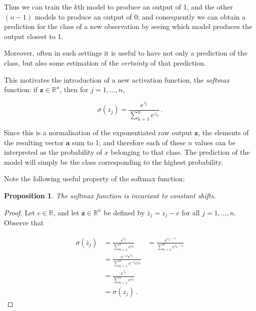 \documentclass{article}[11pt]
\newtheorem{proposition}{Proposition}
\begin{document}
        Thus we can train the $k$th model to produce an output of 1, and the other $(n-1)$ models to produce an output of 0; and consequently we can obtain a prediction for the class of a new observation by seeing which model produces the output closest to 1.

        Moreover, often in such settings it is useful to have not only a prediction of the class, but also some estimation of the \textit{certainty} of that prediction.
        
        This motivates the introduction of a new activation function, the \textit{softmax} function: if $\mathbf{z} \in \mathbb{R}^n$, then for $j = 1, \ldots, n$,
        
        $$
        \sigma(z_j) = \frac{e^{z_j}}{\sum_{k=1}^{n} e^{z_k}} \,.
        $$
        
        Since this is a normalisation of the exponentiated raw output $\mathbf{z}$, the elements of the resulting vector $\mathbf{a}$ sum to 1; and therefore each of these $n$ values can be interpreted as the probability of $x$ belonging to that class. The prediction of the model will simply be the class corresponding to the highest probability.
        
        Note the following useful property of the softmax function: 
        
        \begin{proposition}
            
            The softmax function is invariant to constant shifts.
            
        \end{proposition}
    
        \begin{proof}
            
            Let $c \in \mathbb{R}$, and let $\mathbf{\bar{z}} \in \mathbb{R}^n$ be defined by $\bar{z}_j = z_j - c$ for all $j = 1, \ldots, n$. Observe that
            
            $$ \begin{aligned}
                \sigma(\bar{z}_j)
                &= \frac{e^{\bar{z}_j}}{\sum_{k=1}^{n} e^{\bar{z}_k}}
                &= \frac{e^{z_j - c}}{\sum_{k=1}^{n} e^{z_k - c}} \\
                &= \frac{e^{-c} e^{z_j}}{\sum_{k=1}^{n} e^{-c} e^{z_k}} \\
                &= \frac{e^{z_j}}{\sum_{k=1}^{n} e^{z_k}} \\
                &= \sigma(z_j) \,.
            \end{aligned} $$
            
        \end{proof}
        
\end{document}
